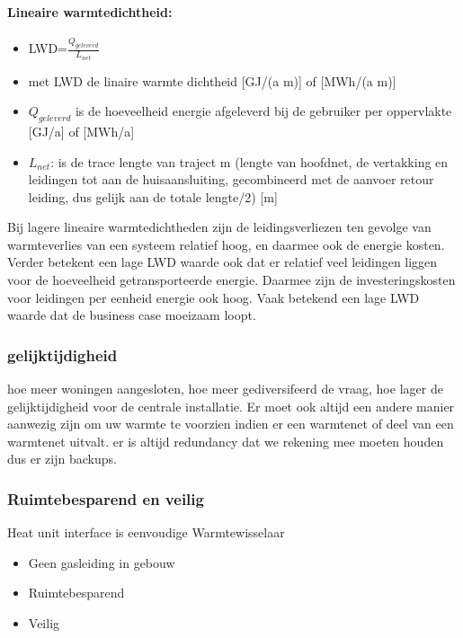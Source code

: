\documentclass[12pt]{article}
\begin{document}
\paragraph{Lineaire warmtedichtheid:}
\begin{itemize}
    \item[] LWD=$\frac{Q_{geleverd}}{L_{net}}$
    \item met LWD de linaire warmte dichtheid [GJ/(a m)] of [MWh/(a m)]
    \item $Q_{geleverd}$ is de hoeveelheid energie afgeleverd bij de gebruiker per oppervlakte [GJ/a] of [MWh/a]
    \item $L_{net}$: is de trace lengte van traject m (lengte van hoofdnet, de vertakking en leidingen tot aan de huisaansluiting, gecombineerd met de aanvoer retour leiding, dus gelijk aan de totale lengte/2) [m]
\end{itemize}
Bij lagere lineaire warmtedichtheden zijn de leidingsverliezen ten gevolge van warmteverlies van een systeem relatief hoog, en daarmee ook de energie kosten. Verder betekent een lage LWD waarde ook dat er relatief veel leidingen liggen voor de hoeveelheid getransporteerde energie. Daarmee zijn de investeringskosten voor leidingen per eenheid energie ook hoog. Vaak betekend een lage LWD waarde dat de business case moeizaam loopt.
\subsubsection{gelijktijdigheid}
hoe meer woningen aangesloten, hoe meer gediversifeerd de vraag, hoe lager de gelijktijdigheid voor de centrale installatie. Er moet ook altijd een andere manier aanwezig zijn om uw warmte te voorzien indien er een warmtenet of deel van een warmtenet uitvalt. er is altijd redundancy dat we rekening mee moeten houden dus er zijn backups.
\subsubsection{Ruimtebesparend en veilig}
Heat unit interface is eenvoudige Warmtewisselaar\begin{itemize}
    \item Geen gasleiding in gebouw 
    \item Ruimtebesparend 
    \item Veilig
\end{itemize}
\end{document}
